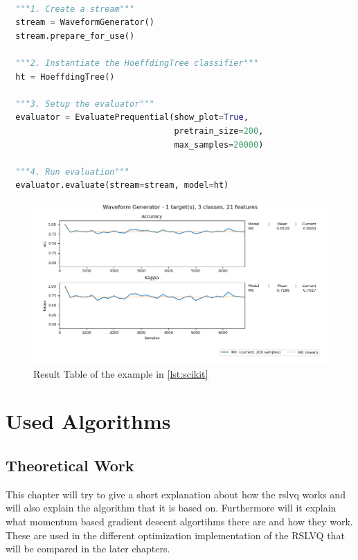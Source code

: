 \documentclass[12pt,oneside,a4paper,parskip]{scrbook}
\begin{document}
\begin{lstlisting}[label=lst:scikit,
  language=python,
  firstnumber=1,
  caption=Simple example of the scikit-multiflow workflow]			   

  """1. Create a stream""" 
  stream = WaveformGenerator()
  stream.prepare_for_use()
  
  """2. Instantiate the HoeffdingTree classifier"""
  ht = HoeffdingTree()
  
  """3. Setup the evaluator"""
  evaluator = EvaluatePrequential(show_plot=True,
                                  pretrain_size=200,
                                  max_samples=20000)
  
  """4. Run evaluation"""
  evaluator.evaluate(stream=stream, model=ht)
\end{lstlisting}

\begin{figure}[H]
  \centering
  \includegraphics[width=\columnwidth]{Scikit_multiflow_example}
  \caption{Result Table of the example in \ref{lst:scikit}} 
  \label{fig:sci_result_examp}
\end{figure}

\chapter{Used Algorithms}

\section{Theoretical Work}

This chapter will try to give a short explanation about how the \ac{rslvq} works and will also explain the algorithm that it is based on. 
Furthermore will it explain what momentum based gradient descent algortihms there are and how they work.
These are used in the different optimization implementation of the RSLVQ that will be compared in the later chapters. 
\end{document}
